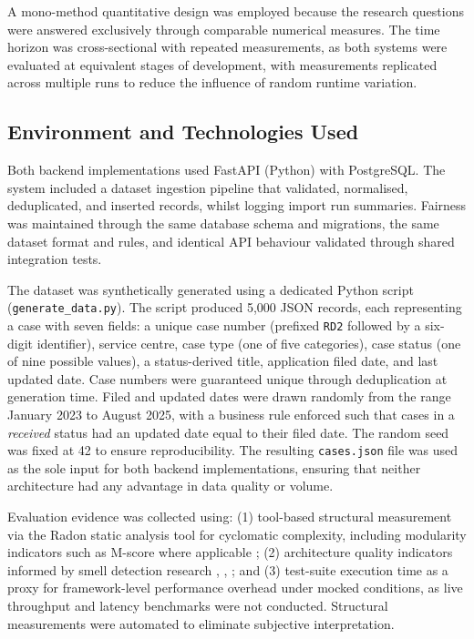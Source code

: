 ﻿\documentclass[conference]{IEEEtran}
\begin{document}
A mono-method quantitative design was employed because the research questions were answered exclusively through comparable numerical measures. The time horizon was cross-sectional with repeated measurements, as both systems were evaluated at equivalent stages of development, with measurements replicated across multiple runs to reduce the influence of random runtime variation.

\subsection{Environment and Technologies Used}
Both backend implementations used FastAPI (Python) with PostgreSQL. The system included a dataset ingestion pipeline that validated, normalised, deduplicated, and inserted records, whilst logging import run summaries. Fairness was maintained through the same database schema and migrations, the same dataset format and rules, and identical API behaviour validated through shared integration tests.

The dataset was synthetically generated using a dedicated Python script (\texttt{generate\_data.py}). The script produced 5{,}000 JSON records, each representing a case with seven fields: a unique case number (prefixed \texttt{RD2} followed by a six-digit identifier), service centre, case type (one of five categories), case status (one of nine possible values), a status-derived title, application filed date, and last updated date. Case numbers were guaranteed unique through deduplication at generation time. Filed and updated dates were drawn randomly from the range January 2023 to August 2025, with a business rule enforced such that cases in a \textit{received} status had an updated date equal to their filed date. The random seed was fixed at 42 to ensure reproducibility. The resulting \texttt{cases.json} file was used as the sole input for both backend implementations, ensuring that neither architecture had any advantage in data quality or volume. 

Evaluation evidence was collected using: (1) tool-based structural measurement via the Radon static analysis tool for cyclomatic complexity, including modularity indicators such as M-score where applicable \cite{b4}; (2) architecture quality indicators informed by smell detection research \cite{b1}, \cite{b3}, \cite{b6}; and (3) test-suite execution time as a proxy for framework-level performance overhead under mocked conditions, as live throughput and latency benchmarks were not conducted. Structural measurements were automated to eliminate subjective interpretation.
\end{document}
